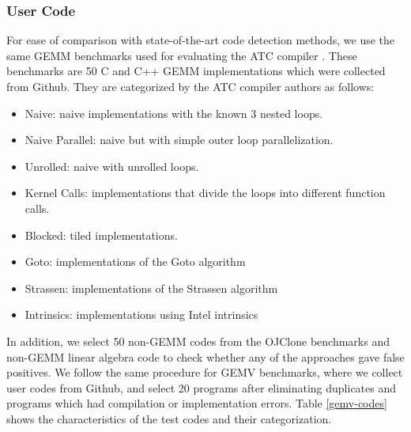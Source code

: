 \documentclass[manuscript,screen,review]{acmart}
\begin{document}
\subsubsection{User Code}
For ease of comparison with state-of-the-art code detection methods, we use the same GEMM benchmarks used for evaluating the ATC compiler \cite{ATC}. These benchmarks are 50 C and C++ GEMM implementations which were collected from Github. They are categorized by the ATC compiler authors as follows: 
\begin{itemize}
	\item Naive: naive implementations with the known 3 nested loops.
	\item Naive Parallel: naive but with simple outer loop parallelization.
	\item Unrolled: naive with unrolled loops.
	\item Kernel Calls: implementations that divide the loops into different function calls.
	\item Blocked: tiled implementations.
	\item Goto: implementations of the Goto algorithm \cite{Goto}
	\item Strassen: implementations of the Strassen algorithm \cite{STRASSEN1969}
	\item Intrinsics: implementations using Intel intrinsics
\end{itemize}
In addition, we select 50 non-GEMM codes from the OJClone benchmarks and non-GEMM linear algebra code to check whether any of the approaches gave false positives. We follow the same procedure for GEMV benchmarks, where we collect user codes from Github, and select 20 programs after eliminating duplicates and programs which had compilation or implementation errors. Table \ref{gemv-codes} shows the characteristics of the test codes and their categorization.

\end{document}
